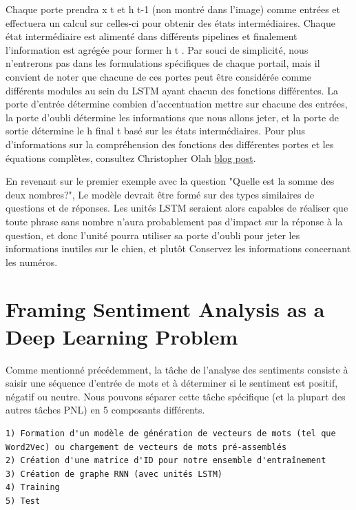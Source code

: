 \documentclass[11pt]{article}
\begin{document}
Chaque porte prendra x t et h t-1 (non montré dans l'image) comme
entrées et effectuera un calcul sur celles-ci pour obtenir des états
intermédiaires. Chaque état intermédiaire est alimenté dans différents
pipelines et finalement l'information est agrégée pour former h t . Par
souci de simplicité, nous n'entrerons pas dans les formulations
spécifiques de chaque portail, mais il convient de noter que chacune de
ces portes peut être considérée comme différents modules au sein du LSTM
ayant chacun des fonctions différentes. La porte d'entrée détermine
combien d'accentuation mettre sur chacune des entrées, la porte d'oubli
détermine les informations que nous allons jeter, et la porte de sortie
détermine le h final t basé sur les états intermédiaires. Pour plus
d'informations sur la compréhension des fonctions des différentes portes
et les équations complètes, consultez Christopher Olah
\href{http://colah.github.io/posts/2015-08-Understanding-LSTMs/}{blog
post}.

En revenant sur le premier exemple avec la question "Quelle est la somme
des deux nombres?", Le modèle devrait être formé sur des types
similaires de questions et de réponses. Les unités LSTM seraient alors
capables de réaliser que toute phrase sans nombre n'aura probablement
pas d'impact sur la réponse à la question, et donc l'unité pourra
utiliser sa porte d'oubli pour jeter les informations inutiles sur le
chien, et plutôt Conservez les informations concernant les numéros.

    \section{Framing Sentiment Analysis as a Deep Learning
Problem}\label{framing-sentiment-analysis-as-a-deep-learning-problem}

    Comme mentionné précédemment, la tâche de l'analyse des sentiments
consiste à saisir une séquence d'entrée de mots et à déterminer si le
sentiment est positif, négatif ou neutre. Nous pouvons séparer cette
tâche spécifique (et la plupart des autres tâches PNL) en 5 composants
différents.

\begin{verbatim}
1) Formation d'un modèle de génération de vecteurs de mots (tel que Word2Vec) ou chargement de vecteurs de mots pré-assemblés
2) Création d'une matrice d'ID pour notre ensemble d'entraînement
3) Création de graphe RNN (avec unités LSTM)
4) Training
5) Test
\end{verbatim}
\end{document}
